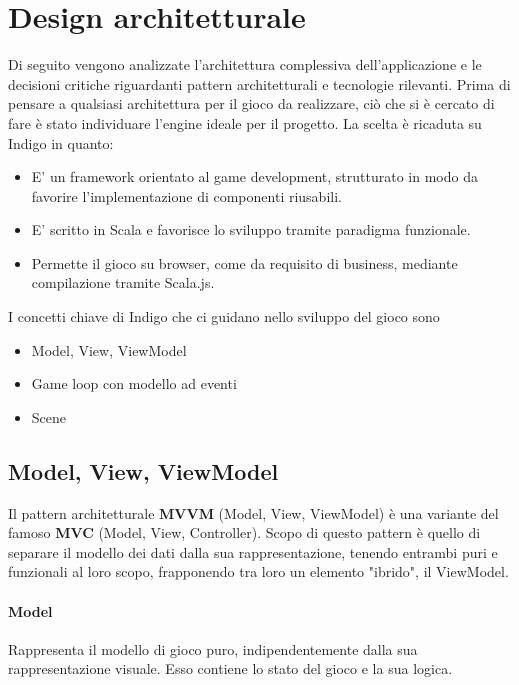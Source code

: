 \section{Design architetturale}

Di seguito vengono analizzate l'architettura complessiva dell'applicazione e le decisioni critiche riguardanti pattern architetturali e tecnologie rilevanti.
Prima di pensare a qualsiasi architettura per il gioco da realizzare, ciò che si è cercato di fare è stato individuare l'engine ideale per il progetto. 
La scelta è ricaduta su Indigo in quanto: 
\begin{itemize}
    \item E' un framework orientato al game development, strutturato in modo da favorire l'implementazione di componenti riusabili. 
    \item E' scritto in Scala e favorisce lo sviluppo tramite paradigma funzionale.
    \item Permette il gioco su browser, come da requisito di business, mediante compilazione tramite Scala.js.
\end{itemize}
I concetti chiave di Indigo che ci guidano nello sviluppo del gioco sono 
\begin{itemize}
    \item Model, View, ViewModel
    \item Game loop con modello ad eventi
    \item Scene
\end{itemize}

\subsection{Model, View, ViewModel}
Il pattern architetturale \textbf{MVVM} (Model, View, ViewModel) è una variante del famoso \textbf{MVC} (Model, View, Controller). 
Scopo di questo pattern è quello di separare il modello dei dati dalla sua rappresentazione, tenendo entrambi puri e funzionali al loro scopo, frapponendo tra loro un elemento "ibrido", il ViewModel.

\paragraph{Model}
Rappresenta il modello di gioco puro, indipendentemente dalla sua rappresentazione visuale. 
Esso contiene lo stato del gioco e la sua logica. 


